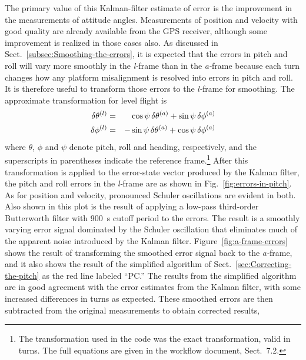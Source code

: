 \documentclass[12pt,twoside,english,12pt,twoside,english]{article}\usepackage[]{graphicx}\usepackage[]{color}
\let\OrgIndex\index
\renewcommand*{\index}[1]{\OrgIndex{#1}}
\begin{document}
The
primary value of this Kalman-filter estimate of error is the improvement
in the measurements of attitude angles.
Measurements of position and velocity
with good quality are already available from the GPS
receiver, although some improvement is realized in those cases also.
As discussed in Sect.~\ref{subsec:Smoothing-the-errors}, it is expected
that the errors in pitch and roll will vary more smoothly in the \emph{l-}frame
than in the \emph{a-}frame
because each turn changes how any platform
misalignment is resolved into errors in pitch and roll. It is therefore
useful to transform those errors
to the \emph{l-}frame for smoothing.
The approximate transformation for level flight is\\
\begin{eqnarray}
\delta\theta^{(l)} & = & \cos\psi\thinspace\delta\theta^{(a)}+\sin\psi\thinspace\delta\phi^{(a)}\label{eq:a-to-l-frame}\\
\delta\phi^{(l)} & = & -\sin\psi\thinspace\delta\theta^{(a)}+\cos\psi\thinspace\delta\phi^{(a)}\nonumber 
\end{eqnarray}
where $\theta$, $\phi$ and $\psi$ denote pitch, roll and heading,
respectively, and the superscripts in parentheses indicate the reference
frame.\footnote{The transformation used in the code was the exact transformation,
valid in turns. The full equations are given in the workflow document,
Sect.~7.2.} After this transformation is applied to the error-state
vector produced by the Kalman filter, the pitch and roll errors in
the \emph{l-}frame
are as shown in Fig.~\ref{fig:errors-in-pitch}.
As for position and velocity, pronounced Schuler oscillations
are evident in both. Also shown in this plot is the result of applying
a low-pass third-order Butterworth filter
with 900~s cutoff period to the errors. The result is a smoothly
varying error signal dominated by the Schuler oscillation that eliminates
much of the apparent noise introduced by the Kalman filter. Figure~\ref{fig:a-frame-errors}
shows the result of transforming the smoothed error
signal back to the \emph{a-}frame, and it also shows the result of
the simplified algorithm of Sect.~\ref{sec:Correcting-the-pitch}
as the red line labeled ``PC.'' The results from the simplified
algorithm are in good agreement with the error estimates from the
Kalman filter, with some increased differences in turns as expected.
These smoothed errors are then subtracted from the original measurements
to obtain corrected results,
\end{document}
